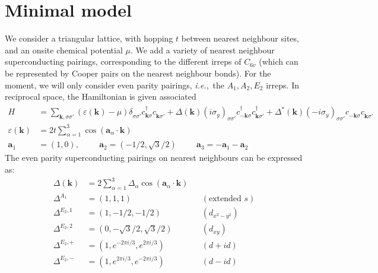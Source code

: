 \documentclass[10pt]{article}
\newcommand{\ie}{{\it i.e.},\ }
\newcommand{\ba}{\boldsymbol{a}}
\newcommand{\bk}{\boldsymbol{k}}
\begin{document}
\section{Minimal model}

We consider a triangular lattice, with hopping $t$ between nearest neighbour sites, and an onsite chemical potential $\mu$. We add a variety of nearest neighbour superconducting pairings, corresponding to the different irreps of $C_{6v}$ (which can be represented by Cooper pairs on the nearest neighbour bonds). For the moment, we will only consider even parity pairings, \ie the $A_1, A_2, E_2$ irreps.
In reciprocal space, the Hamiltonian is given associated
\begin{align}
    H &= \sum_{\bk, \sigma \sigma'}
    ( \varepsilon (\bk) - \mu ) \delta^{\phantom{\dagger}}_{\sigma \sigma'} c^{\dagger}_{\bk \sigma} c^{\phantom{\dagger}}_{\bk \sigma'}
    + \Delta (\bk) (i \sigma_y)^{\phantom{\dagger}}_{\sigma \sigma'} c^{\dagger}_{-\bk \sigma} c^{{\dagger}}_{\bk \sigma'}
    + \Delta^{*} (\bk) (-i \sigma_y)^{\phantom{\dagger}}_{\sigma \sigma'} c^{\phantom{\dagger}}_{-\bk \sigma} c^{\phantom{\dagger}}_{\bk \sigma'} \\
    \varepsilon (\bk) &= 2t \sum_{\alpha = 1}^{3} \cos (\ba_\alpha \cdot \bk ) \\
    \ba_1 &= (1,0), \hspace{1cm} \ba_2 = (-1/2, \sqrt{3}/2) \hspace{1cm} \ba_3 = -\ba_1 - \ba_2
\end{align}
The even parity superconducting pairings on nearest neighbours can be expressed as:
\begin{align}
    \Delta (\bk) &= 2 \sum_{\alpha = 1}^3 \Delta_\alpha \cos (\ba_\alpha \cdot \bk) \\
    \Delta^{A_1} &= (1,1,1)  &&(\text{extended } s)\\
    \Delta^{E_2, 1} &= (1,-1/2, -1/2) &&(d_{x^2-y^2}) \\
    \Delta^{E_2, 2} &= (0,-\sqrt{3}/2,\sqrt{3}/2)  &&(d_{xy})\\
    \Delta^{E_2, +} &= (1, e^{-2 \pi i /3}, e^{2 \pi i /3}) &&(d+id)\\
    \Delta^{E_2, -} &= (1, e^{2 \pi i /3}, e^{-2 \pi i /3}) &&(d-id)
\end{align}
\end{document}
